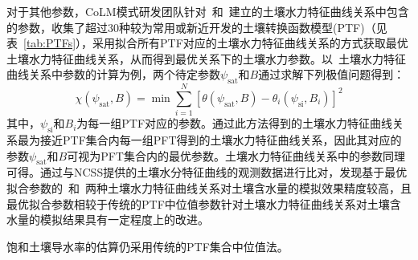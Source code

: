 对于其他参数，CoLM模式研发团队针对~\citet{campbell1974}和~\citet{van1980closed}建立的土壤水力特征曲线关系中包含的参数，收集了超过30种较为常用或新近开发的土壤转换函数模型(PTF)（见表~\ref{tab:PTFs}），采用拟合所有PTF对应的土壤水力特征曲线关系的方式获取最优土壤水力特征曲线关系，从而得到最优关系下的土壤水力参数。以~\citet{campbell1974}土壤水力特征曲线关系中参数的计算为例，两个待定参数$\psi_{\mathrm {sat}} $和$B$通过求解下列极值问题得到：$$\chi\left(\psi_{\mathrm {sat}} ,B\right)=\min\sum_{i=1}^N\left[\theta\left(\psi_{\mathrm {sat}} ,B\right)-\theta_i\left(\psi_{\mathrm{si}},B_{i}\right)\right]^2$$
其中，$\psi_{\mathrm{si}}$和$B_{i}$为每一组PTF对应的参数。通过此方法得到的土壤水力特征曲线关系最为接近PTF集合内每一组PFT得到的土壤水力特征曲线关系，因此其对应的参数$\psi_{\mathrm{sat}}$和$B$可视为PFT集合内的最优参数。\citet{van1980closed}土壤水力特征曲线关系中的参数同理可得。\citet{dai2019parameters}通过与NCSS提供的土壤水分特征曲线的观测数据进行比对，发现基于最优拟合参数的~\citet{campbell1974}和~\citet{van1980closed}两种土壤水力特征曲线关系对土壤含水量的模拟效果精度较高，且最优拟合参数相较于传统的PTF中位值参数针对土壤水力特征曲线关系对土壤含水量的模拟结果具有一定程度上的改进。

饱和土壤导水率的估算仍采用传统的PTF集合中位值法。

